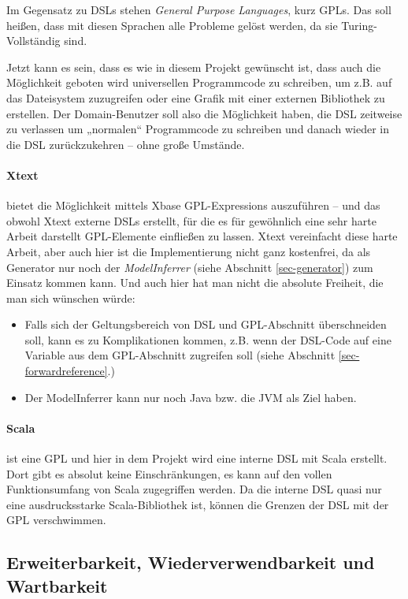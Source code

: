 Im Gegensatz zu DSLs stehen \emph{General Purpose Languages}, kurz GPLs.
Das soll heißen, dass mit diesen Sprachen alle Probleme gelöst werden, da
sie Turing-Vollständig sind.

Jetzt kann es sein, dass es wie in diesem Projekt gewünscht ist, dass
auch die Möglichkeit geboten wird universellen Programmcode zu schreiben,
um z.B. auf das Dateisystem zuzugreifen oder eine Grafik mit einer
externen Bibliothek zu erstellen. Der Domain-Benutzer soll also die
Möglichkeit haben, die DSL zeitweise zu verlassen um „normalen“ Programmcode
zu schreiben und danach wieder in die DSL zurückzukehren -- ohne große
Umstände.

\paragraph{Xtext} bietet die Möglichkeit mittels Xbase GPL-Expressions
auszuführen -- und das obwohl Xtext externe DSLs erstellt, für die es für
gewöhnlich eine sehr harte Arbeit darstellt GPL-Elemente einfließen zu lassen.
Xtext vereinfacht diese harte Arbeit, aber auch hier ist die Implementierung
nicht ganz kostenfrei, da als Generator nur noch der \emph{ModelInferrer}
(siehe Abschnitt \ref{sec-generator}) zum Einsatz kommen kann.
Und auch hier hat man nicht die absolute Freiheit, die man sich wünschen
würde:

\begin{itemize}
  \item Falls sich der Geltungsbereich von DSL und GPL-Abschnitt überschneiden
        soll, kann es zu Komplikationen kommen, z.B. wenn der DSL-Code
        auf eine Variable aus dem GPL-Abschnitt zugreifen soll (siehe
        Abschnitt \ref{sec-forwardreference}.)
  \item Der ModelInferrer kann nur noch Java bzw. die JVM als Ziel haben.
\end{itemize}

\paragraph{Scala} ist eine GPL und hier in dem Projekt wird eine interne
DSL mit Scala erstellt. Dort gibt es absolut keine Einschränkungen, es
kann auf den vollen Funktionsumfang von Scala zugegriffen werden.
Da die interne DSL quasi nur eine ausdrucksstarke Scala-Bibliothek ist,
können die Grenzen der DSL mit der GPL verschwimmen.


\subsection{Erweiterbarkeit, Wiederverwendbarkeit und Wartbarkeit}
\label{sec-erweiterbar}

